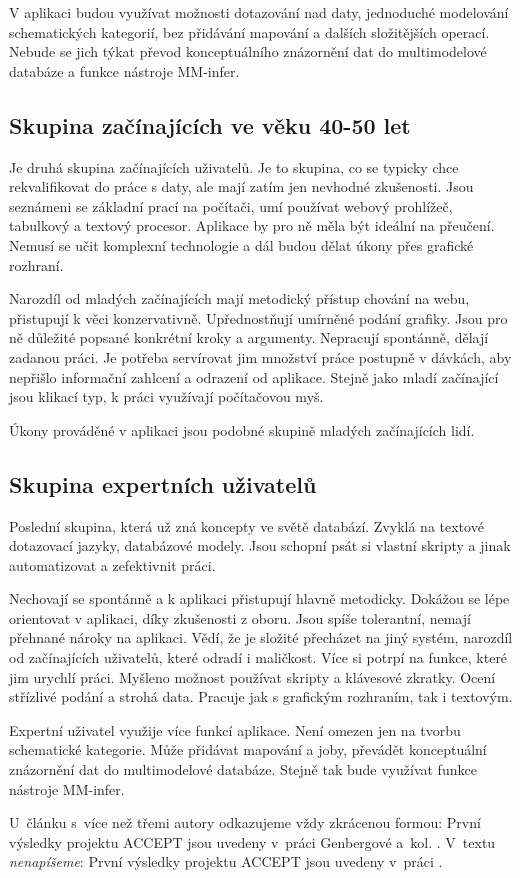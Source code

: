 V aplikaci budou využívat možnosti dotazování nad daty, jednoduché modelování schematických kategorií, bez přidávání mapování a dalších složitějších operací. Nebude se jich týkat převod konceptuálního znázornění dat do multimodelové databáze a funkce nástroje MM-infer.

\subsection{Skupina začínajících ve věku 40-50 let}

Je druhá skupina začínajících uživatelů. Je to skupina, co se typicky chce rekvalifikovat do práce s daty, ale mají zatím jen nevhodné zkušenosti. Jsou seznámeni se základní prací na počítači, umí používat webový prohlížeč, tabulkový a textový procesor. Aplikace by pro ně měla být ideální na přeučení. Nemusí se učit komplexní technologie a dál budou dělat úkony přes grafické rozhraní.

Narozdíl od mladých začínajících mají metodický přístup chování na webu, přistupují k věci konzervativně. Upřednostňují umírněné podání grafiky. Jsou pro ně důležité popsané konkrétní kroky a argumenty. Nepracují spontánně, dělají zadanou práci. Je potřeba servírovat jim množství práce postupně v dávkách, aby nepřišlo informační zahlcení a odrazení od aplikace. Stejně jako mladí začínající jsou klikací typ, k práci využívají počítačovou myš. 

Úkony prováděné v aplikaci jsou podobné skupině mladých začínajících lidí.

\subsection{Skupina expertních uživatelů}

Poslední skupina, která už zná koncepty ve světě databází. Zvyklá na textové dotazovací jazyky, databázové modely. Jsou schopní psát si vlastní skripty a jinak automatizovat a zefektivnit práci.

Nechovají se spontánně a k aplikaci přistupují hlavně metodicky. Dokážou se lépe orientovat v aplikaci, díky zkušenosti z oboru. Jsou spíše tolerantní, nemají přehnané nároky na aplikaci. Vědí, že je složité přecházet na jiný systém, narozdíl od začínajících uživatelů, které odradí i maličkost. Více si potrpí na funkce, které jim urychlí práci. Myšleno možnost používat skripty a klávesové zkratky. Ocení střízlivé podání a strohá data. Pracuje jak s grafickým rozhraním, tak i textovým.

Expertní uživatel využije více funkcí aplikace. Není omezen jen na tvorbu schematické kategorie. Může přidávat mapování a joby, převádět konceptuální znázornění dat do multimodelové databáze. Stejně tak bude využívat funkce nástroje MM-infer.


U~článku s~více než třemi autory odkazujeme vždy zkrácenou formou:
První výsledky projektu ACCEPT jsou uvedeny v~práci Genbergové a~kol.
\citep{Genberget08}. V~textu \emph{nenapíšeme}: První výsledky
projektu ACCEPT jsou uvedeny v~práci \citet*{Genberget08}.